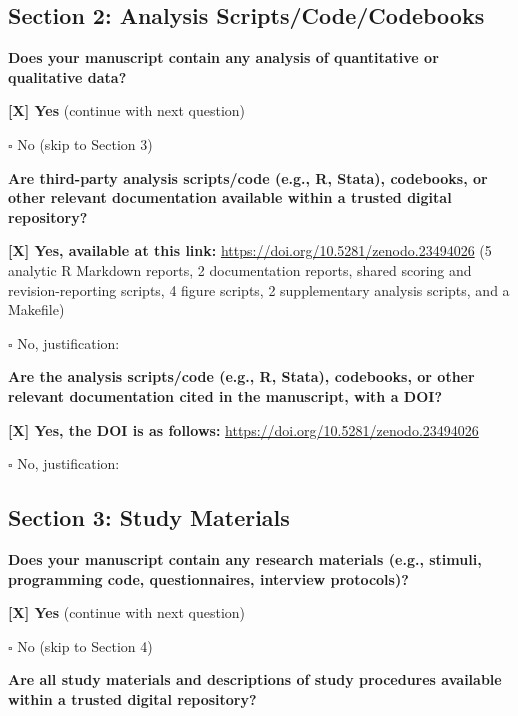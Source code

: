 \documentclass[
  12pt,
]{article}
\begin{document}
\bigskip

\hypertarget{section-2-analysis}{%
\subsection*{Section 2: Analysis Scripts/Code/Codebooks}\label{section-2-analysis}}

\textbf{Does your manuscript contain any analysis of quantitative or qualitative data?}

\textbf{[X] Yes} (continue with next question)

\quad $\square$ No (skip to Section 3)

\bigskip

\textbf{Are third-party analysis scripts/code (e.g., R, Stata), codebooks, or other relevant documentation available within a trusted digital repository?}

\textbf{[X] Yes, available at this link:} \url{https://doi.org/10.5281/zenodo.23494026} (5 analytic R Markdown reports, 2 documentation reports, shared scoring and revision-reporting scripts, 4 figure scripts, 2 supplementary analysis scripts, and a Makefile)

\quad $\square$ No, justification:

\bigskip

\textbf{Are the analysis scripts/code (e.g., R, Stata), codebooks, or other relevant documentation cited in the manuscript, with a DOI?}

\textbf{[X] Yes, the DOI is as follows:} \url{https://doi.org/10.5281/zenodo.23494026}

\quad $\square$ No, justification:

\bigskip

\hypertarget{section-3-materials}{%
\subsection*{Section 3: Study Materials}\label{section-3-materials}}

\textbf{Does your manuscript contain any research materials (e.g., stimuli, programming code, questionnaires, interview protocols)?}

\textbf{[X] Yes} (continue with next question)

\quad $\square$ No (skip to Section 4)

\bigskip

\textbf{Are all study materials and descriptions of study procedures available within a trusted digital repository?}
\end{document}
